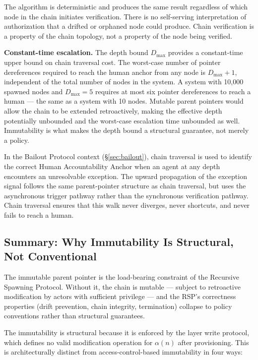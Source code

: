 The algorithm is deterministic and produces the same result regardless of which node in the chain initiates verification. There is no self-serving interpretation of authorization that a drifted or orphaned node could produce. Chain verification is a property of the chain topology, not a property of the node being verified.

\medskip
\noindent\textbf{Constant-time escalation.} The depth bound $D_{\max}$ provides a constant-time upper bound on chain traversal cost. The worst-case number of pointer dereferences required to reach the human anchor from any node is $D_{\max} + 1$, independent of the total number of nodes in the system. A system with 10,000 spawned nodes and $D_{\max} = 5$ requires at most six pointer dereferences to reach a human --- the same as a system with 10 nodes. Mutable parent pointers would allow the chain to be extended retroactively, making the effective depth potentially unbounded and the worst-case escalation time unbounded as well. Immutability is what makes the depth bound a structural guarantee, not merely a policy.

In the Bailout Protocol context (\S\ref{sec:bailout}), chain traversal is used to identify the correct Human Accountability Anchor when an agent at any depth encounters an unresolvable exception. The upward propagation of the exception signal follows the same parent-pointer structure as chain traversal, but uses the asynchronous trigger pathway rather than the synchronous verification pathway. Chain traversal ensures that this walk never diverges, never shortcuts, and never fails to reach a human.

\subsection{Summary: Why Immutability Is Structural, Not Conventional}
\label{sec:immutability-structural-summary}

The immutable parent pointer is the load-bearing constraint of the Recursive Spawning Protocol. Without it, the chain is mutable --- subject to retroactive modification by actors with sufficient privilege --- and the RSP's correctness properties (drift prevention, chain integrity, termination) collapse to policy conventions rather than structural guarantees.

The immutability is structural because it is enforced by the \fact{} layer write protocol, which defines no valid modification operation for $\alpha(n)$ after provisioning. This is architecturally distinct from access-control-based immutability in four ways:

